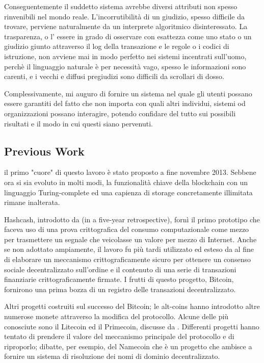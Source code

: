 \documentclass[9pt,oneside]{amsart}
\begin{document}
\begin{multicols}{2}
Conseguentemente il suddetto sistema avrebbe diversi attributi non spesso rinvenibili nel mondo reale. L'incorrutibilità di un giudizio, spesso difficile da trovare, perviene naturalmente da un interprete algoritmico disinteressato. La trasparenza, o l' essere in grado di osservare con esattezza come uno stato o un giudizio giunto attraverso il log della transazione e le regole o i codici di istruzione, non avviene mai in modo perfetto nei sistemi incentrati sull'uomo, perchè il linguaggio naturale è per necessità vago, spesso le informazioni sono carenti, e i vecchi e diffusi pregiudizi sono difficili da scrollari di dosso.

Complessivamente, mi auguro di fornire un sistema nel quale gli utenti possano essere garantiti del fatto che non importa con quali altri individui, sistemi od organizzazioni possano interagire, potendo confidare del tutto sui possibili risultati e il modo in cui questi siano pervenuti.

\subsection{Previous Work} \label{ch:previous}

\cite{buterin2013ethereum} il primo "cuore" di questo lavoro è stato proposto a fine novembre 2013. Sebbene ora si sia evoluto in molti modi, la funzionalità chiave della blockchain con un linguaggio Turing-complete ed una capienza di storage concretamente illimitata rimane inalterata.

Hashcash, introdotto da \cite{back2002hashcash} (in a five-year retrospective), fornì il primo prototipo che faceva uso di una prova crittografica del consumo computazionale come mezzo per  trasmettere un segnale che veicolasse un valore per mezzo di Internet. Anche se non adottato ampiamente, il lavoro fu più tardi utilizzato ed esteso da \cite{nakamoto2008bitcoin} al fine di elaborare un meccanismo crittograficamente sicuro per ottenere un consenso sociale decentralizzato sull'ordine e il contenuto di una serie di transazioni finanziarie crittograficamente firmate. I frutti di questo progetto, Bitcoin, fornirono una prima bozza di un registro delle transazioni decentralizzato.

Altri progetti costruiti sul successo del Bitcoin; le alt-coins hanno introdotto altre numerose monete attraverso la modifica del protocollo. Alcune delle più conosciute sono il Litecoin ed il Primecoin, discusse da \cite{sprankel2013technical}. Differenti progetti hanno tentato di prendere il valore del meccanismo principale del protocollo e di riproporlo; \cite{aron2012bitcoin} dibatte, per esempio, del Namecoin che è un progetto che ambisce a fornire un sistema di risoluzione dei nomi di dominio decentralizzato.


\end{multicols}
\end{document}

